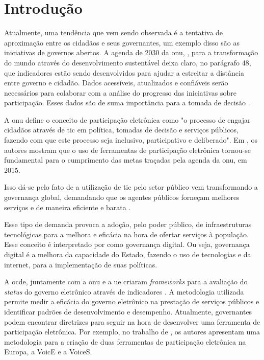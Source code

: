 \chapter[Introdução]{Introdução}
\label{cap:cap1}
Atualmente, uma tendência que vem sendo observada é a tentativa de aproximação entre os cidadãos e seus governantes, um exemplo disso são as iniciativas de governos abertos.
A agenda de 2030 da \acrfull{onu}, , para a transformação do mundo através do desenvolvimento sustentável deixa claro, no parágrafo 48, que
indicadores estão sendo desenvolvidos para ajudar a estreitar a distância entre governo e cidadão. Dados acessíveis, atualizados e confiáveis serão necessários para colaborar 
com a análise do progresso das iniciativas sobre participação. 
Esses dados são de suma importância para a tomada de decisão \cite{assembly2015transforming}.

\par
A \acrshort{onu} define o conceito de participação eletrônica como "o processo de engajar cidadãos através de \acrfull{tic} em política, tomadas de decisão e
serviços públicos, fazendo com que este processo seja inclusivo, participativo e deliberado". Em , os autores mostram que o uso de 
ferramentas de participação eletrônica tornou-se fundamental para o cumprimento das metas traçadas pela agenda da \acrshort{onu}, em 2015. 

\par
Isso dá-se pelo fato de a utilização de \acrshort{tic} pelo setor público vem transformando a governança global, demandando que os agentes públicos forneçam melhores serviços e 
de maneira eficiente e barata \cite{afdb2014uneca}. 

\par
Esse tipo de demanda provoca a adoção, pelo poder público, de infraestruturas tecnológicas para a melhora e eficácia na hora de ofertar serviços à população. Esse conceito é interpretado
por  como governança digital. Ou seja, governança digital é a melhora da capacidade do Estado, fazendo o uso de tecnologias e da internet, 
para a implementação de suas políticas.

\par
A \acrfull{ocde}, juntamente com a \acrshort{onu} e a \acrfull{ue} criaram \textit{frameworks} para a avaliação do \textit{status} do governo eletrônico através de indicadores \cite{onu2018}. A metodologia utilizada permite medir a eficácia do governo eletrônico na prestação de serviços públicos e identificar padrões de desenvolvimento e desempenho.
Atualmente, governantes podem encontrar diretrizes para seguir na hora de desenvolver uma ferramenta de participação eletrônica. 
Por exemplo,  no trabalho de , os autores apresentam uma metodologia para a criação de duas ferramentas de participação eletrônica na Europa, a VoicE e a VoiceS.

